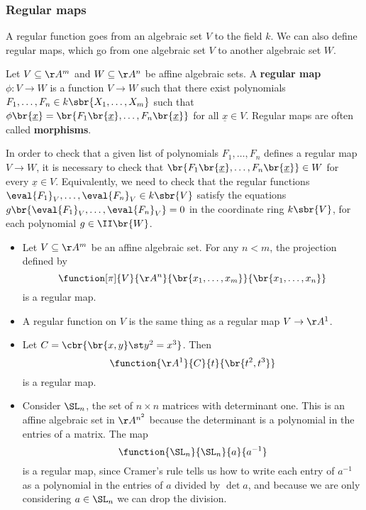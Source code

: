 \subsubsection{Regular maps}

A regular function goes from an algebraic set $ V $ to the field $ k $. We can also define regular maps, which go from one algebraic set $ V $ to another algebraic set $ W $.

\begin{definition*}
Let $ V \subseteq \AA^m $ and $ W \subseteq \AA^n $ be affine algebraic sets. A \textbf{regular map} $ \phi : V \to W $ is a function $ V \to W $ such that there exist polynomials $ F_1, \dots, F_n \in k\sbr{X_1, \dots, X_m} $ such that $ \phi\br{\underline{x}} = \br{F_1\br{\underline{x}}, \dots, F_n\br{\underline{x}}} $ for all $ \underline{x} \in V $. Regular maps are often called \textbf{morphisms}.
\end{definition*}

\begin{note*}
In order to check that a given list of polynomials $ F_1, \dots, F_n $ defines a regular map $ V \to W $, it is necessary to check that $ \br{F_1\br{\underline{x}}, \dots, F_n\br{\underline{x}}} \in W $ for every $ \underline{x} \in V $. Equivalently, we need to check that the regular functions $ \eval{F_1}_V, \dots, \eval{F_n}_V \in k\sbr{V} $ satisfy the equations $ g\br{\eval{F_1}_V, \dots, \eval{F_n}_V} = 0 $ in the coordinate ring $ k\sbr{V} $, for each polynomial $ g \in \II\br{W} $.
\end{note*}

\pagebreak

\begin{example*}
\hfill
\begin{itemize}
\item Let $ V \subseteq \AA^m $ be an affine algebraic set. For any $ n < m $, the projection defined by
$$ \function[\pi]{V}{\AA^n}{\br{x_1, \dots, x_m}}{\br{x_1, \dots, x_n}} $$
is a regular map.
\item A regular function on $ V $ is the same thing as a regular map $ V \to \AA^1 $.
\item Let $ C = \cbr{\br{x, y} \st y^2 = x^3} $. Then
$$ \function{\AA^1}{C}{t}{\br{t^2, t^3}} $$
is a regular map.
\item Consider $ \SL_n $, the set of $ n \times n $ matrices with determinant one. This is an affine algebraic set in $ \AA^{n^2} $ because the determinant is a polynomial in the entries of a matrix. The map
$$ \function{\SL_n}{\SL_n}{a}{a^{-1}} $$
is a regular map, since Cramer's rule tells us how to write each entry of $ a^{-1} $ as a polynomial in the entries of $ a $ divided by $ \det a $, and because we are only considering $ a \in \SL_n $ we can drop the division.
\end{itemize}
\end{example*}

